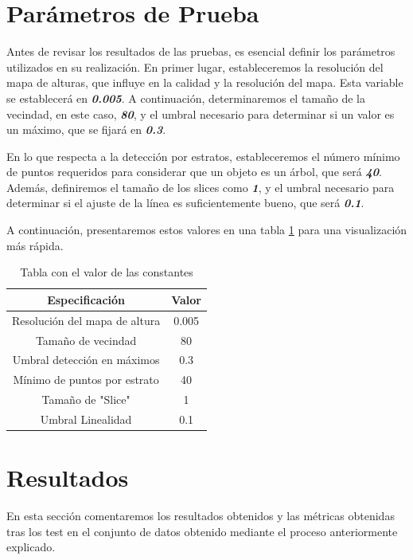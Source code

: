 \section{Parámetros de Prueba}

Antes de revisar los resultados de las pruebas, es esencial definir los parámetros utilizados en su realización. En primer lugar, estableceremos la resolución del mapa de alturas, que influye en la calidad y la resolución del mapa. Esta variable se establecerá en \textit{\textbf{0.005}}. A continuación, determinaremos el tamaño de la vecindad, en este caso, \textit{\textbf{80}}, y el umbral necesario para determinar si un valor es un máximo, que se fijará en \textit{\textbf{0.3}}.

En lo que respecta a la detección por estratos, estableceremos el número mínimo de puntos requeridos para considerar que un objeto es un árbol, que será \textit{\textbf{40}}. Además, definiremos el tamaño de los slices como \textit{\textbf{1}}, y el umbral necesario para determinar si el ajuste de la línea es suficientemente bueno, que será \textit{\textbf{0.1}}.

A continuación, presentaremos estos valores en una tabla \ref{tablavar} para una visualización más rápida.
\begin{table}[h]
\centering
{}
\begin{tabular}{c|c}
\rowcolor{udcpink!25}
\textbf{Especificación} & \textbf{Valor} \\\hline

Resolución del mapa de altura & 0.005 \\
Tamaño de vecindad & 80 \\
Umbral detección en máximos & 0.3 \\
Mínimo de puntos por estrato & 40 \\
Tamaño de "Slice" & 1 \\
Umbral Linealidad & 0.1 \\


\end{tabular}
\caption{Tabla con el valor de las constantes}
\label{tablavar}
\end{table}

\section{Resultados}
En esta sección comentaremos los resultados obtenidos y las métricas obtenidas tras los test en el conjunto de datos obtenido mediante el proceso anteriormente explicado.

